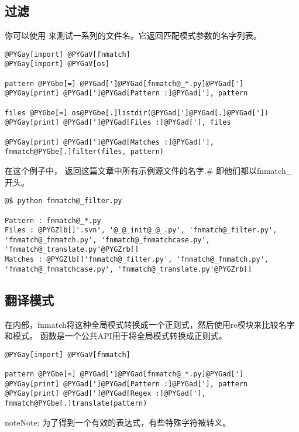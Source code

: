 \documentclass[a4paper,10pt,english]{manual}
\begin{document}
\subsection{过滤}

你可以使用  来测试一系列的文件名。它返回匹配模式参数的名字列表。

\begin{Verbatim}[commandchars=@\[\]]
@PYGay[import] @PYGaV[fnmatch]
@PYGay[import] @PYGaV[os]

pattern @PYGbe[=] @PYGad[']@PYGad[fnmatch@_*.py]@PYGad[']
@PYGay[print] @PYGad[']@PYGad[Pattern :]@PYGad['], pattern

files @PYGbe[=] os@PYGbe[.]listdir(@PYGad[']@PYGad[.]@PYGad['])
@PYGay[print] @PYGad[']@PYGad[Files :]@PYGad['], files

@PYGay[print] @PYGad[']@PYGad[Matches :]@PYGad['], fnmatch@PYGbe[.]filter(files, pattern)
\end{Verbatim}

在这个例子中，  返回这篇文章中所有示例源文件的名字.\# 即他们都以fnmatch\_开头。

\begin{Verbatim}[commandchars=@\[\]]
@$ python fnmatch@_filter.py

Pattern : fnmatch@_*.py
Files : @PYGZlb[]'.svn', '@_@_init@_@_.py', 'fnmatch@_filter.py', 'fnmatch@_fnmatch.py', 'fnmatch@_fnmatchcase.py', 'fnmatch@_translate.py'@PYGZrb[]
Matches : @PYGZlb[]'fnmatch@_filter.py', 'fnmatch@_fnmatch.py', 'fnmatch@_fnmatchcase.py', 'fnmatch@_translate.py'@PYGZrb[]
\end{Verbatim}


\subsection{翻译模式}

在内部，fnmatch将这种全局模式转换成一个正则式，然后使用re模块来比较名字和模式。  函数是一个公共API用于将全局模式转换成正则式。

\begin{Verbatim}[commandchars=@\[\]]
@PYGay[import] @PYGaV[fnmatch]

pattern @PYGbe[=] @PYGad[']@PYGad[fnmatch@_*.py]@PYGad[']
@PYGay[print] @PYGad[']@PYGad[Pattern :]@PYGad['], pattern
@PYGay[print] @PYGad[']@PYGad[Regex :]@PYGad['], fnmatch@PYGbe[.]translate(pattern)
\end{Verbatim}

\begin{notice}{note}{Note:}
为了得到一个有效的表达式，有些特殊字符被转义。
\end{notice}
\end{document}
